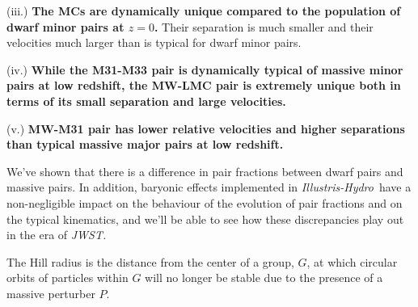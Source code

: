 \documentclass[twocolumn]{aastex63}
\newcommand\IH{\textit{Illustris-Hydro}}
\begin{document}
(iii.) \textbf{The MCs are dynamically unique compared to the population of dwarf minor pairs at $z=0$.} Their separation is much smaller and their velocities much larger than is typical for dwarf minor pairs.

(iv.) \textbf{While the M31-M33 pair is dynamically typical of massive minor pairs at low redshift, the MW-LMC pair is extremely unique both in terms of its small separation and large velocities.} 

(v.) \textbf{MW-M31 pair has lower relative velocities and higher separations than typical massive major pairs at low redshift.}

We've shown that there is a difference in pair fractions between dwarf pairs and massive pairs. In addition, baryonic effects implemented in \IH\ have a non-negligible impact on the behaviour of the evolution of pair fractions and on the typical kinematics, and we'll be able to see how these discrepancies play out in the era of \textit{JWST.} 







The Hill radius is the distance from the center of a group, $G$, at which circular orbits of particles within $G$ will no longer be stable due to the presence of a massive perturber $P$.
\end{document}
